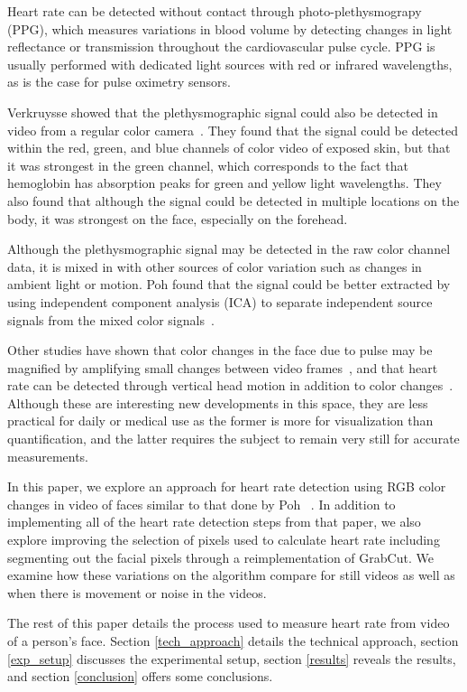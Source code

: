 \documentclass[10pt,twocolumn,letterpaper]{article}
\begin{document}
Heart rate can be detected without contact through photo-plethysmograpy (PPG), which measures variations in blood volume by detecting changes in light reflectance or transmission throughout the cardiovascular pulse cycle. PPG is usually performed with dedicated light sources with red or infrared wavelengths, as is the case for pulse oximetry sensors. 

Verkruysse \etal showed that the plethysmographic signal could also be detected in video from a regular color camera~\cite{Nelson:2008aa}. They found that the signal could be detected within the red, green, and blue channels of color video of exposed skin, but that it was strongest in the green channel, which corresponds to the fact that hemoglobin has absorption peaks for green and yellow light wavelengths. They also found that although the signal could be detected in multiple locations on the body, it was strongest on the face, especially on the forehead.

Although the plethysmographic signal may be detected in the raw color channel data, it is mixed in with other sources of color variation such as changes in ambient light or motion. Poh \etal found that the signal could be better extracted by using independent component analysis (ICA) to separate independent source signals from the mixed color signals~\cite{Poh:2010aa}.

Other studies have shown that color changes in the face due to pulse may be magnified by amplifying small changes between video frames~\cite{Wu:2012aa}, and that heart rate can be detected through vertical head motion in addition to color changes~\cite{Balakrishnan:2013aa}. Although these are interesting new developments in this space, they are less practical for daily or medical use as the former is more for visualization than quantification, and the latter requires the subject to remain very still for accurate measurements.

In this paper, we explore an approach for heart rate detection using RGB color changes in video of faces similar to that done by Poh \etal~\cite{Poh:2010aa}. In addition to implementing all of the heart rate detection steps from that paper, we also explore improving the selection of pixels used to calculate heart rate including segmenting out the facial pixels through a reimplementation of GrabCut. We examine how these variations on the algorithm compare for still videos as well as when there is movement or noise in the videos.

The rest of this paper details the process used to measure heart rate from video of a person's face. Section \ref{tech_approach} details the technical approach, section \ref{exp_setup} discusses the experimental setup, section \ref{results} reveals the results, and section \ref{conclusion} offers some conclusions.
\end{document}
